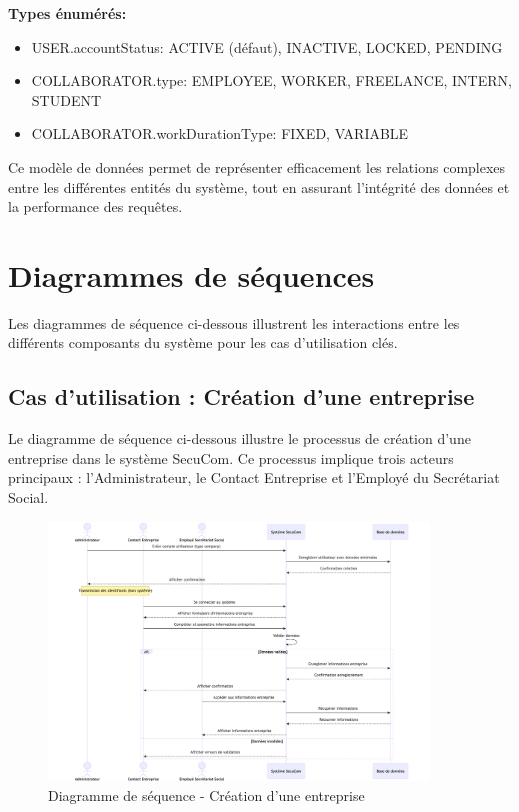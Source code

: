 \documentclass[12pt,a4paper]{report}
\begin{document}
\textbf{Types énumérés:}
\begin{itemize}
  \item USER.accountStatus: ACTIVE (défaut), INACTIVE, LOCKED, PENDING
  \item COLLABORATOR.type: EMPLOYEE, WORKER, FREELANCE, INTERN, STUDENT
  \item COLLABORATOR.workDurationType: FIXED, VARIABLE
\end{itemize}

Ce modèle de données permet de représenter efficacement les relations complexes entre les différentes entités du système, tout en assurant l'intégrité des données et la performance des requêtes.

\section{Diagrammes de séquences}

Les diagrammes de séquence ci-dessous illustrent les interactions entre les différents composants du système pour les cas d'utilisation clés.

\subsection{Cas d'utilisation : Création d'une entreprise}

Le diagramme de séquence ci-dessous illustre le processus de création d'une entreprise dans le système SecuCom. Ce processus implique trois acteurs principaux : l'Administrateur, le Contact Entreprise et l'Employé du Secrétariat Social.

\begin{figure}[h]
\centering
\includegraphics[width=0.9\textwidth]{SD_creation_entreprise.png}
\caption{Diagramme de séquence - Création d'une entreprise}
\end{figure}
\end{document}
